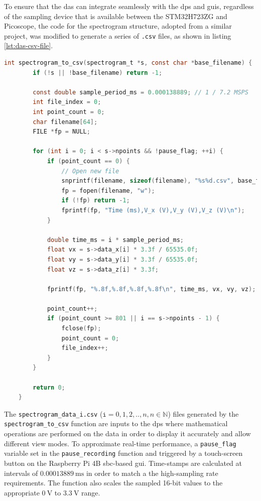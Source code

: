 \documentclass[class=report,11pt,crop=false]{standalone}
\begin{document}
	To ensure that the \acrshort{das} can integrate seamlessly with the \acrfull{dps} and \acrfull{guis}, regardless of the sampling device that is available between the STM32H723ZG and Picoscope, the code for the spectrogram structure, adopted from a similar project, was modified to generate a series of \texttt{.csv} files, as shown in listing \ref{lst:das-csv-file}. 
	\begin{lstlisting}[language=C, label={lst:das-csv-file}, caption={Code snippet of the function for storing the interleaved sampling data in a \texttt{.csv}.}]
	int spectrogram_to_csv(spectrogram_t *s, const char *base_filename) {
		if (!s || !base_filename) return -1;
		
		const double sample_period_ms = 0.000138889; // 1 / 7.2 MSPS
		int file_index = 0;
		int point_count = 0;
		char filename[64];
		FILE *fp = NULL;
		
		for (int i = 0; i < s->npoints && !pause_flag; ++i) {
			if (point_count == 0) {
				// Open new file
				snprintf(filename, sizeof(filename), "%s%d.csv", base_filename, file_index);
				fp = fopen(filename, "w");
				if (!fp) return -1;
				fprintf(fp, "Time (ms),V_x (V),V_y (V),V_z (V)\n");
			}
			
			double time_ms = i * sample_period_ms;
			float vx = s->data_x[i] * 3.3f / 65535.0f;
			float vy = s->data_y[i] * 3.3f / 65535.0f;
			float vz = s->data_z[i] * 3.3f;
			
			fprintf(fp, "%.8f,%.8f,%.8f,%.8f\n", time_ms, vx, vy, vz);
			
			point_count++;
			if (point_count >= 801 || i == s->npoints - 1) {
				fclose(fp);
				point_count = 0;
				file_index++;
			}
		}
		
		return 0;
	}
	\end{lstlisting}
	The \texttt{spectrogram\_data\_i.csv} ($\texttt{i}=0,1,2,..,n, n \in \mathbb{N}$) files generated by the \texttt{spectrogram\_to\_csv} function are inputs to the \acrshort{dps} where mathematical operations are performed on the data in order to display it accurately and allow different view modes. To approximate real-time performance, a \texttt{pause\_flag} variable set in the \texttt{pause\_recording} function and triggered by a touch-screen button on the Raspberry Pi 4B \acrshort{sbc}-based \acrshort{gui}. Time-stamps are calculated at intervals of $\SI{0.00013889}{\milli\second}$ in order to match a the high-sampling rate requirements. The function also scales the sampled 16-bit values to the appropriate $\SI{0}{\volt}$ to $\SI{3.3}{\volt}$ range. 
	
\end{document}
